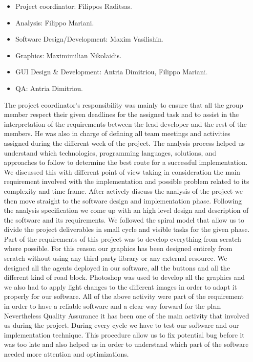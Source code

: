 \documentclass[oneside]{article}
\begin{document}
\begin{itemize}

\item Project coordinator: Filippos Raditsas. \item Analysis: Filippo Mariani. \item Software Design/Development: Maxim Vasilishin. \item Graphics: Maximimilian Nikolaidis. \item GUI Design \& Development: Antria Dimitriou, Filippo Mariani. \item QA: Antria Dimitriou.

\end{itemize}

\noindent The project coordinator's responsibility was mainly to ensure that all the group member respect their given deadlines for the assigned task and to assist in the interpretation of the requirements between the lead developer and the rest of the members. He was also in charge of defining all team meetings and activities assigned during the different week of the project. The analysis process helped us understand which technologies, programming languages, solutions, and approaches to follow to determine the best route for a successful implementation. We discussed this with different point of view taking in consideration the main requirement involved with the implementation and possible problem related to its complexity and time frame. After actively discuss the analysis of the project we then move straight to the software design and implementation phase. Following the analysis specification we come up with an high level design and description of the software and its requirements. We followed the spiral model that allow us to divide the project deliverables in small cycle and visible tasks for the given phase. Part of the requirements of this project was to develop everything from scratch where possible. For this reason our graphics has been designed entirely from scratch without using any third-party library or any external resource. We designed all the agents deployed in our software, all the buttons and all the different kind of road block. Photoshop was used to develop all the graphics and we also had to apply light changes to the different images in order to adapt it properly for our software. All of the above activity were part of the requirement in order to have a reliable software and a clear way forward for the plan. Nevertheless Quality Assurance it has been one of the main activity that involved us during the project. During every cycle we have to test our software and our implementation technique. This procedure allow us to fix potential bug before it was too late and also helped us in order to understand which part of the software needed more attention and optimizations.
\end{document}
